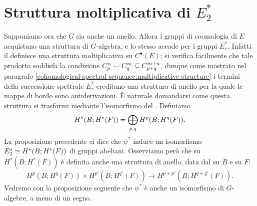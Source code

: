 \section{Struttura moltiplicativa di \texorpdfstring{\(E^*_2\)}{E*2}}
Supponiamo ora che \(G\) sia anche un anello. Allora i gruppi di coomologia di \(E\) acquistano una struttura di \(G\)-algebra, e lo stesso accade per i gruppi \(E^\ast_r\). Infatti il \cupproduct{} definisce una struttura moltiplicativa su \(C^\bullet(E)\); si verifica facilmente che tale prodotto soddisfa la condizione \(C^n_p\mathbin{\smile} C^m_q\subseteq C^{m+n}_{p+q}\), dunque come mostrato nel paragrafo \ref{cohomological-spectral-sequence:multiplicative-structure} i termini della successione spettrale \(E^\ast_r\) ereditano una struttura di anello per la quale le mappe di bordo sono antiderivazioni. È naturale domandarsi come questa struttura si trasformi mediante l'isomorfismo del .
Definiamo
\[
H^*(B;H^*(F))=\bigoplus_{p,q}H^p(B;H^q(F)).
\]
La proposizione precedente ci dice che \(\psi^*\) induce un isomorfismo \(E^\ast_2\simeq H^*(B;H^*(F))\) di gruppi abeliani.
Osserviamo però che su \(H^*(B;H^*(F))\) è definita anche una struttura di anello, data dal \cupproduct{} su \(B\) e su \(F\):
\[
H^p(B;H^q(F))\times H^{p'}(B;H^{q'}(F))\longrightarrow H^{p+p'}(B;H^{q+q'}(F)).
\]
Vedremo con la proposizione seguente che \(\psi^*\) è anche un isomorfismo di \(G\)-algebre, a meno di un segno.

